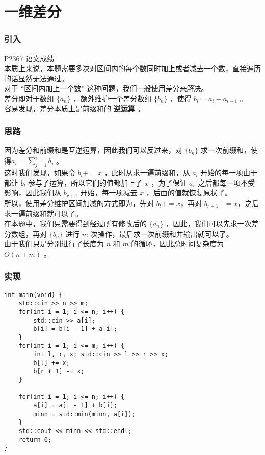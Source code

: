 \documentclass{beamer}
\newcommand{\fdf}[1]{\alert{\textbf{#1}}}
\begin{document}
\section{一维差分}
\begin{frame}
\frametitle{引入}
P2367 语文成绩 \\ 
本质上来说，本题需要多次对区间内的每个数同时加上或者减去一个数，直接遍历的话显然无法通过。 	\\ 
对于 “区间内加上一个数” 这种问题，我们一般使用差分来解决。 \\
差分即对于数组 $\{a_n\}$ ，额外维护一个差分数组 $\{b_n\}$ ，使得 $b_i = a_i - a_{i - 1}$ 。 \\ 
容易发现，差分本质上是前缀和的 \fdf{逆运算} 。
\end{frame}
\begin{frame}
\frametitle{思路}
因为差分和前缀和是互逆运算，因此我们可以反过来，对 $\{b_n\}$ 求一次前缀和，使得$a_i = \sum_{j = 1}^{i}b_j$ 。 \\
这时我们发现，如果令 $b_l += x$ ，此时从求一遍前缀和，从 $a_l$ 开始的每一项由于都让 $b_l$ 参与了运算，所以它们的值都加上了 $x$ ，为了保证 $a_r$ 之后都每一项不受影响，因此我们从 $b_{r + 1}$ 开始，每一项减去 $x$ ，后面的值就恢复原状了。 \\ 
所以，使用差分维护区间加减的方式即为，先对 $b_l += x$，再对 $b_{r + 1} -= x$，之后求一遍前缀和就可以了。 \\ 
在本题中，我们只需要得到经过所有修改后的 $\{a_n\}$ ，因此，我们可以先求一次差分数组，再对 $\{b_n\}$ 进行 $m$ 次操作，最后求一次前缀和并输出就可以了。\\
由于我们只是分别进行了长度为 $n$ 和 $m$ 的循环，因此总时间复杂度为 $O(n + m)$ 。
\end{frame}
\begin{frame}[fragile]
\frametitle{实现}
\begin{onlyenv}
\begin{verbatim}
int main(void) {
    std::cin >> n >> m;
    for(int i = 1; i <= n; i++) {
        std::cin >> a[i];
        b[i] = b[i - 1] + a[i];
    }
    for(int i = 1; i <= m; i++) {
        int l, r, x; std::cin >> l >> r >> x;
        b[l] += x;
        b[r + 1] -= x;
    }

    for(int i = 1; i <= n; i++) {
        a[i] = a[i - 1] + b[i];
        minn = std::min(minn, a[i]);
    }
    std::cout << minn << std::endl;
    return 0;
}
\end{verbatim}
\end{onlyenv}
\end{frame}
\end{document}
